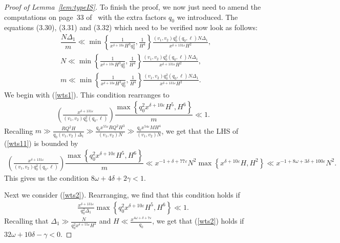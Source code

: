\documentclass{amsart}
\numberwithin{equation}{section}
\begin{document}
\begin{proof}[Proof of Lemma~\ref{lem:typeIS}]
 \medskip To finish the proof, we now just need to amend the computations on page~33 of~\cite{Stadlmann:2023:PAP} with the extra factors $q_0$ we introduced. The equations (3.30), (3.31) and (3.32) which need to be verified now look as follows:
\begin{align} \label{wts1}
&\dfrac{N\Delta_1}{ m}  \ll   \min\left\{\frac{1}{x^{\delta+10\varepsilon}H^3 q_0^2},\frac{1}{H^4}\right\}\frac{(v_1,v_2)q_0^2(q_0,\ell)  N \Delta_1}{ x^{\delta+131\varepsilon}H^2}, \\ \label{wts2}
 &N \ll  \min\left\{\frac{1}{x^{\delta+10\varepsilon}H^3 q_0^2},\frac{1}{H^4}\right\}\frac{(v_1,v_2)q_0^2(q_0,\ell)  N \Delta_1}{ x^{\delta+131\varepsilon}H^2 }, \\ \label{wts3}
&m \ll  \min\left\{\frac{1}{x^{\delta+10\varepsilon}H^3 q_0^2},\frac{1}{H^4}\right\}\frac{(v_1,v_2)q_0^2(q_0,\ell)  N \Delta_1}{ x^{\delta+131\varepsilon}H^2}.
\end{align} 
We begin with (\ref{wts1}). This condition rearranges to
\begin{align} \label{wts11}
\left( \frac{ x^{\delta+131\varepsilon}}{(v_1,v_2)q_0^2(q_0,\ell)  }\right) \dfrac{\max\left\{ q_0^2x^{\delta+10\varepsilon}H^5,H^6\right\}}{ m}  \ll  1. 
\end{align}
Recalling     $m \gg \tfrac{RQ^2H}{q_0 (v_1,v_2)\Delta_1} \gg \tfrac{ q_0 x^{55\varepsilon}RQ^2H^3}{ (v_1,v_2)N} \gg \tfrac{q_0 x^{54\varepsilon}  M H^4}{(v_1,v_2)N}$, we  get that the LHS of (\ref{wts11}) is bounded  by 
\begin{align*} 
\left( \frac{ x^{\delta+131\varepsilon}}{(v_1,v_2)q_0^2(q_0,\ell)  }\right) \dfrac{\max\left\{q_0^2 x^{\delta+10\varepsilon}H^5,H^6\right\}}{ m}  \ll   x^{-1+\delta+77\varepsilon}N^2 \max\left\{x^{\delta+10\varepsilon}H,H^2\right\} \ll  x^{-1+8\omega+3\delta+100\varepsilon}  N^2. 
\end{align*}
This gives us the condition $8\omega+4\delta + 2\gamma < 1$.

\medskip
Next we consider (\ref{wts2}). Rearranging, we find that this condition holds if
\begin{align*}
\frac{x^{\delta+131\varepsilon}}{q_0^2\Delta_1}\max\left\{q_0^2x^{\delta+10\varepsilon}H^5,H^6\right\} \ll  1.
\end{align*}
Recalling that $\Delta_1  \gg \frac{N}{q_0^2x^{\delta+55\varepsilon} H^2}   $ and $H \ll \tfrac{x^{4\omega+\delta+7\varepsilon}}{q_0}$, we get that  (\ref{wts2}) holds if $32 \omega + 10 \delta -\gamma<0 $.
 
\medskip 


\end{proof}
\end{document}
